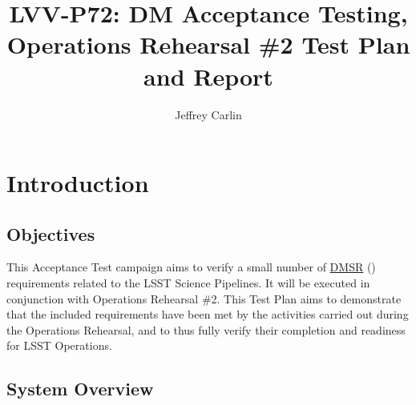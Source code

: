 \documentclass[DM,lsstdraft,STR,toc]{lsstdoc}
\begin{document}
\def\milestoneName{DM Acceptance Testing, Operations Rehearsal \#2}
\def\milestoneId{LVV-P72}
\def\product{Acceptance}


\title{LVV-P72: DM Acceptance Testing, Operations Rehearsal \#2 Test Plan and Report}
\setDocRef{\lsstDocType-\lsstDocNum}
\date{\vcsdate}
\author{ Jeffrey Carlin }






\maketitle

\section{Introduction}
\label{sect:intro}


\subsection{Objectives}
\label{sect:objectives}

 This Acceptance Test campaign aims to verify a small number of
\href{https://lse-61.lsst.io/}{DMSR} () requirements related to
the LSST Science Pipelines. It will be executed in conjunction with
Operations Rehearsal \#2. This Test Plan aims to demonstrate that the
included requirements have been met by the activities carried out during
the Operations Rehearsal, and to thus fully verify their completion and
readiness for LSST Operations.



\subsection{System Overview}
\label{sect:systemoverview}
\end{document}
